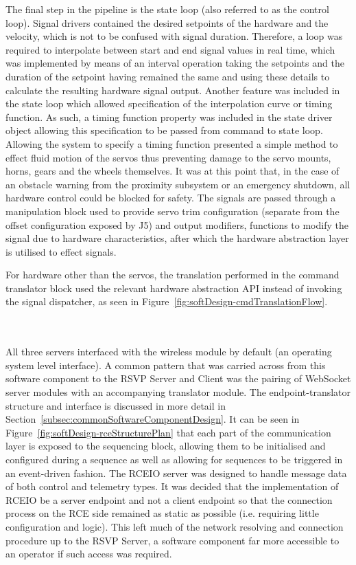           The final step in the pipeline is the state loop (also referred to as the control loop). Signal drivers contained the desired setpoints of the hardware and the velocity, which is not to be confused with signal duration. Therefore, a loop was required to interpolate between start and end signal values in real time, which was implemented by means of an interval operation taking the setpoints and the duration of the setpoint having remained the same and using these details to calculate the resulting hardware signal output. Another feature was included in the state loop which allowed specification of the interpolation curve or timing function. As such, a timing function property was included in the state driver object allowing this specification to be passed from command to state loop. Allowing the system to specify a timing function presented a simple method to effect fluid motion of the servos thus preventing damage to the servo mounts, horns, gears and the wheels themselves. It was at this point that, in the case of an obstacle warning from the proximity subsystem or an emergency shutdown, all hardware control could be blocked for safety. The signals are passed through a manipulation block used to provide servo trim configuration (separate from the offset configuration exposed by J5) and output modifiers, functions to modify the signal due to hardware characteristics, after which the hardware abstraction layer is utilised to effect signals.
          
          For hardware other than the servos, the translation performed in the command translator block used the relevant hardware abstraction API instead of invoking the signal dispatcher, as seen in Figure~\ref{fig:softDesign-cmdTranslationFlow}.
          
         \\\\
           All three servers interfaced with the wireless module by default (an operating system level interface). A common pattern that was carried across from this software component to the RSVP Server and Client was the pairing of WebSocket server modules with an accompanying translator module. The endpoint-translator structure and interface is discussed in more detail in Section~\ref{subsec:commonSoftwareComponentDesign}. It can be seen in Figure~\ref{fig:softDesign-rceStructurePlan} that each part of the communication layer is exposed to the sequencing block, allowing them to be initialised and configured during a sequence as well as allowing for sequences to be triggered in an event-driven fashion. The RCEIO server was designed to handle message data of both control and telemetry types. It was decided that the implementation of RCEIO be a server endpoint and not a client endpoint so that the connection process on the RCE side remained as static as possible (i.e. requiring little configuration and logic). This left much of the network resolving and connection procedure up to the RSVP Server, a software component far more accessible to an operator if such access was required.
           
